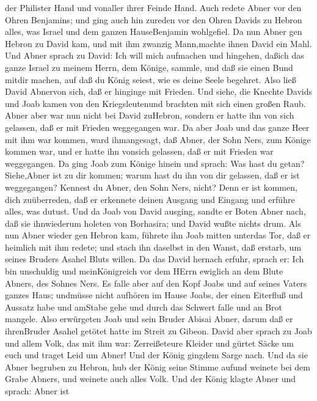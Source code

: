 der Philister Hand und vonaller ihrer Feinde Hand.  Auch
redete Abner vor den Ohren Benjamins; und ging auch hin zureden vor den
Ohren Davids zu Hebron alles, was Israel und dem ganzen HauseBenjamin
wohlgefiel.  Da nun Abner gen Hebron zu David kam, und mit
ihm zwanzig Mann,machte ihnen David ein Mahl.  Und Abner
sprach zu David: Ich will mich aufmachen und hingehen, daßich das ganze
Israel zu meinem Herrn, dem Könige, sammle, und daß sie einen Bund
mitdir machen, auf daß du König seiest, wie es deine Seele begehret.
Also ließ David Abnervon sich, daß er hinginge mit Frieden.
 Und siehe, die Knechte Davids und Joab kamen von den
Kriegsleutenund brachten mit sich einen großen Raub. Abner aber war nun
nicht bei David zuHebron, sondern er hatte ihn von sich gelassen, daß er
mit Frieden weggegangen war.  Da aber Joab und das ganze
Heer mit ihm war kommen, ward ihmangesagt, daß Abner, der Sohn Ners, zum
Könige kommen war, und er hatte ihn vonsich gelassen, daß er mit Frieden
war weggegangen.  Da ging Joab zum Könige hinein und
sprach: Was hast du getan? Siehe,Abner ist zu dir kommen; warum hast du
ihn von dir gelassen, daß er ist weggegangen?  Kennest du
Abner, den Sohn Ners, nicht? Denn er ist kommen, dich zuüberreden, daß
er erkennete deinen Ausgang und Eingang und erführe alles, was dutust.
 Und da Joab von David ausging, sandte er Boten Abner nach,
daß sie ihnwiederum holeten von Borhasira; und David wußte nichts drum.
 Als nun Abner wieder gen Hebron kam, führete ihn Joab
mitten unterdas Tor, daß er heimlich mit ihm redete; und stach ihn
daselbst in den Wanst, daß erstarb, um seines Bruders Asahel Bluts
willen.  Da das David hernach erfuhr, sprach er: Ich bin
unschuldig und meinKönigreich vor dem HErrn ewiglich an dem Blute
Abners, des Sohnes Ners.  Es falle aber auf den Kopf Joabs
und auf seines Vaters ganzes Haus; undmüsse nicht aufhören im Hause
Joabs, der einen Eiterfluß und Aussatz habe und amStabe gehe und durch
das Schwert falle und an Brot mangele.  Also erwürgeten
Joab und sein Bruder Abisai Abner, darum daß er ihrenBruder Asahel
getötet hatte im Streit zu Gibeon.  David aber sprach zu
Joab und allem Volk, das mit ihm war: Zerreißeteure Kleider und gürtet
Säcke um euch und traget Leid um Abner! Und der König gingdem Sarge
nach.  Und da sie Abner begruben zu Hebron, hub der König
seine Stimme aufund weinete bei dem Grabe Abners, und weinete auch alles
Volk.  Und der König klagte Abner und sprach: Abner ist
